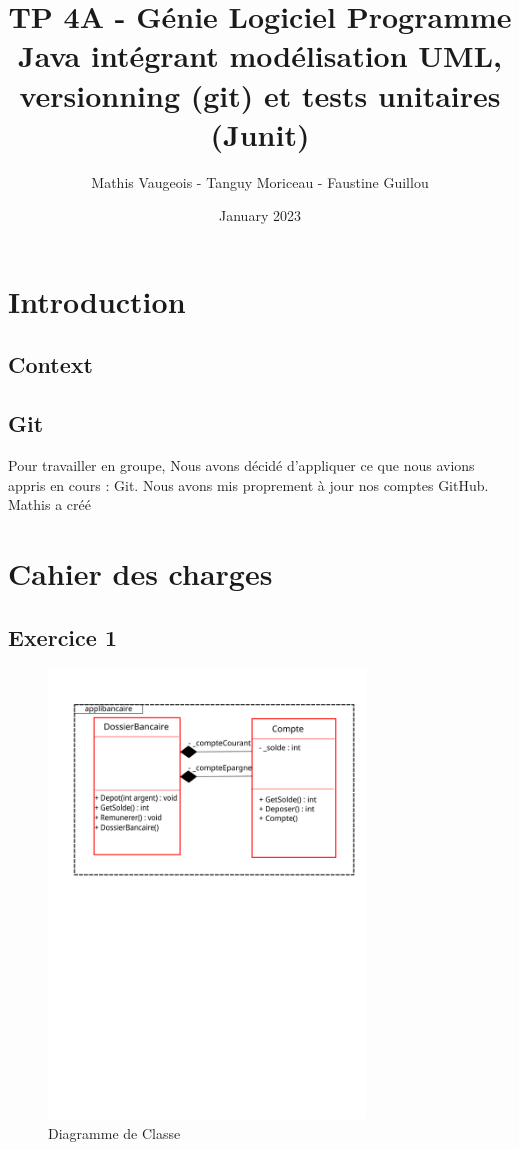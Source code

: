 \documentclass{article}
\title{TP 4A - Génie Logiciel
Programme Java intégrant modélisation UML, versionning (git)
et tests unitaires (Junit)
}
\author{Mathis Vaugeois - Tanguy Moriceau - Faustine Guillou}
\date{January 2023}
\begin{document}
\maketitle
\tableofcontents

\newpage
\section{Introduction}
\subsection{Context}

\subsection{Git}

Pour travailler en groupe, Nous avons décidé d'appliquer ce que nous avions appris en cours : Git. Nous avons mis proprement à jour nos comptes GitHub. Mathis a créé

\newpage
\section{Cahier des charges}
\subsection{Exercice 1}

\begin{figure}
    \centering
    \includegraphics[width=0.75\textwidth]{diagrammeClasse}
    \caption{Diagramme de Classe}
    \label{fig:mesh1}
\end{figure}
\end{document}
